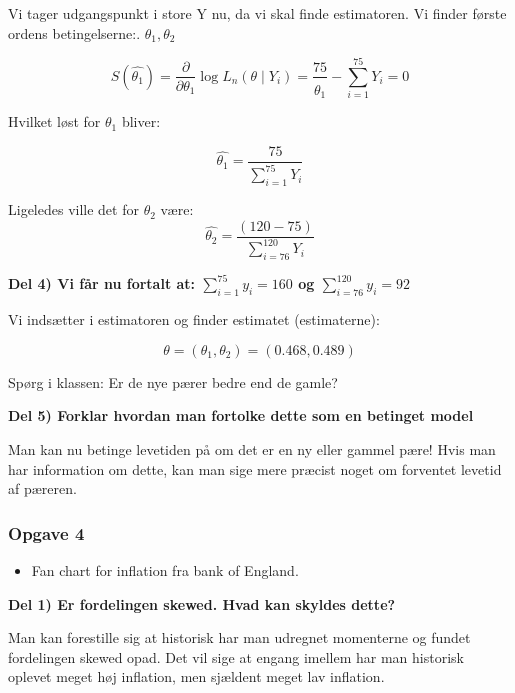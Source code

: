 Vi tager udgangspunkt i store Y nu, da vi skal finde estimatoren. Vi finder første ordens betingelserne:. $\theta_1, \theta_2$

\begin{equation}
    S(\hat{\theta_1}) = \frac{\partial}{\partial \theta_1} \log L_n (\theta \mid Y_i) = \frac{75}{\hat{\theta_1}} - \sum_{i=1}^{75} Y_i = 0
\end{equation}

Hvilket løst for $\theta_1$ bliver:

\begin{equation}
\hat{\theta_1} = \frac{75}{\sum_{i=1}^{75} Y_i }
\end{equation}

Ligeledes ville det for $\theta_2$ være:
\begin{equation}
\hat{\theta_2} = \frac{(120 - 75)}{\sum_{i=76}^{120} Y_i }
\end{equation}

\textbf{Del 4) Vi får nu fortalt at: $\sum_{i=1}^{75}  y_i = 160$ og $\sum_{i=76}^{120}  y_i = 92$}


Vi indsætter i estimatoren og finder estimatet (estimaterne):

\begin{equation}
    \theta = ( \theta_1, \theta_2) = (0.468, 0.489)
\end{equation}

Spørg i klassen: Er de nye pærer bedre end de gamle?

\textbf{Del 5) Forklar hvordan man fortolke dette som en betinget model}

Man kan nu betinge levetiden på om det er en ny eller gammel pære! Hvis man har information om dette, kan man sige mere præcist noget om forventet levetid af pæreren.

\subsubsection{Opgave 4}

\begin{itemize}
    \item Fan chart for inflation fra bank of England.
\end{itemize}

\textbf{Del 1) Er fordelingen skewed. Hvad kan skyldes dette?}

Man kan forestille sig at historisk har man udregnet momenterne og fundet fordelingen skewed opad. Det vil sige at  engang imellem har man historisk oplevet meget høj inflation, men sjældent meget lav inflation.


